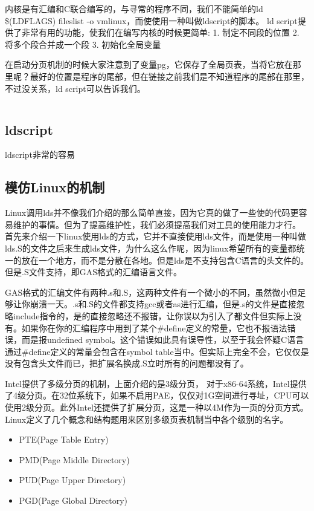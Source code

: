 内核是有汇编和C联合编写的，与寻常的程序不同，我们不能简单的ld \$(LDFLAGS) fileslist -o vmlinux，而使使用一种叫做ldscript的脚本。 ld script提供了非常有用的功能，使我们在编写内核的时候更简单:
1. 制定不同段的位置
2. 将多个段合并成一个段
3. 初始化全局变量

在启动分页机制的时候大家注意到了变量pg，它保存了全局页表，当将它放在那里呢？最好的位置是程序的尾部，但在链接之前我们是不知道程序的尾部在那里，不过没关系，ld script可以告诉我们。
\begin{lstlisting}[language=bash]


\end{lstlisting}


\subsection{ldscript}
ldscript非常的容易

\subsection{模仿Linux的机制}
Linux调用lds并不像我们介绍的那么简单直接，因为它真的做了一些使的代码更容易维护的事情。但为了提高维护性，我们必须提高我们对工具的使用能力才行。
首先来介绍一下linux使用lds的方式，它并不直接使用lds文件，而是使用一种叫做lds.S的文件之后来生成lds文件，为什么这么作呢，因为linux希望所有的变量都统一的放在一个地方，而不是分散在各地。但是lds是不支持包含C语言的头文件的。但是.S文件支持，即GAS格式的汇编语言文件。

GAS格式的汇编文件有两种.s和.S，这两种文件有一个微小的不同，虽然微小但足够让你崩溃一天。.s和.S的文件都支持gcc或者as进行汇编，但是.s的文件是直接忽略include指令的，是的直接忽略还不报错，让你误以为引入了都文件但实际上没有。如果你在你的汇编程序中用到了某个\#define定义的常量，它也不报语法错误，而是报undefined symbol。这个错误如此具有误导性，以至于我会怀疑C语言通过\#define定义的常量会包含在symbol table当中。但实际上完全不会，它仅仅是没有包含头文件而已，把扩展名换成.S立时所有的问题都没有了。



Intel提供了多级分页的机制，上面介绍的是3级分页， 对于x86-64系统，Intel提供了4级分页。在32位系统下，如果不启用PAE，仅仅对1G空间进行寻址，CPU可以使用2级分页。此外Intel还提供了扩展分页，这是一种以4M作为一页的分页方式。Linux定义了几个概念和结构题用来区别多级页表机制当中各个级别的名字。

\begin{itemize}
  \item PTE(Page Table Entry)
  \item PMD(Page Middle Directory)
  \item PUD(Page Upper Directory)
  \item PGD(Page Global Directory)
\end{itemize}

